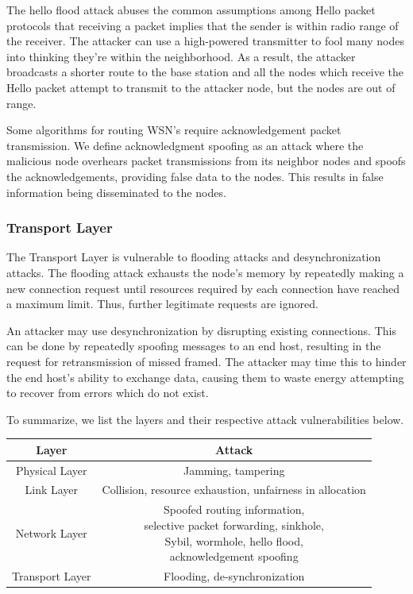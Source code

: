 \documentclass[12pt,a4paper,twoside]{report}
\begin{document}
The hello flood attack abuses the common assumptions among Hello packet protocols that receiving a packet implies that the sender is within radio range of the receiver. The attacker can use a high-powered transmitter to fool many nodes into thinking they're within the neighborhood. As a result, the attacker broadcasts a shorter route to the base station and all the nodes which receive the Hello packet attempt to transmit to the attacker node, but the nodes are out of range. \par
Some algorithms for routing WSN's require acknowledgement packet transmission. We define acknowledgment spoofing as an attack where the malicious node overhears packet transmissions from its neighbor nodes and spoofs the acknowledgements, providing false data to the nodes. This results in false information being disseminated to the nodes. \par
\subsubsection{Transport Layer}
The Transport Layer is vulnerable to flooding attacks and desynchronization attacks. The flooding attack exhausts the node's memory by repeatedly making a new connection request until resources required by each connection have reached a maximum limit. Thus, further legitimate requests are ignored.\par
An attacker may use desynchronization by disrupting existing connections. This can be done by repeatedly spoofing messages to an end host, resulting in the request for retransmission of missed framed. The attacker may time this to hinder the end host's ability to exchange data, causing them to waste energy attempting to recover from errors which do not exist. \par
To summarize, we list the layers and their respective attack vulnerabilities below. \par
\FloatBarrier
  \begin{table}[h]
  	\begin{center}
    \begin{tabular}{|c|c|} \hline
	        Layer & Attack \\ \hline\hline
	        Physical Layer & Jamming, tampering \\ \hline
	        Link Layer & Collision, resource exhaustion, unfairness in allocation \\ \hline
	        Network Layer & \shortstack{Spoofed routing information, \\selective packet forwarding, sinkhole,\\ Sybil, wormhole, hello flood, \\acknowledgement spoofing} \\ \hline
	        Transport Layer & Flooding, de-synchronization \\ \hline
	  \end{tabular}
	  \end{center}
  \end{table}
\FloatBarrier
\end{document}
